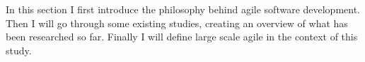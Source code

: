 In this section I first introduce the philosophy behind agile software
development. Then I will go through some existing studies, creating an overview
of what has been researched so far. Finally I will define large scale agile in
the context of this study.
